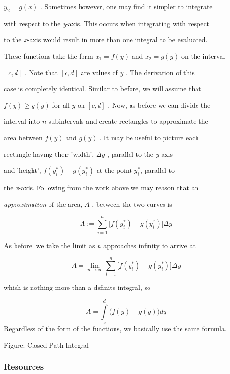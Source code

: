 $y_2=g(x)$ . Sometimes however, one may find it simpler to integrate

with respect to the \textit{y}-axis. This occurs when integrating with respect

to the \textit{x}-axis would result in more than one integral to be evaluated.

These functions take the form $x_1=f(y)$ and $x_2=g(y)$ on the interval

$[c,d]$ . Note that $[c,d]$ are values of $y$ . The derivation of this

case is completely identical. Similar to before, we will assume that

$f(y)\ge g(y)$ for all $y$ on $[c,d]$ . Now, as before we can divide the

interval into $n$ subintervals and create rectangles to approximate the

area between $f(y)$ and $g(y)$ . It may be useful to picture each

rectangle having their 'width', $\Delta y$ , parallel to the \textit{y}-axis

and 'height', $f(y_i^{*})-g(y_i^{*})$ at the point $y_i^{*}$, parallel to

the \textit{x}-axis. Following from the work above we may reason that an

\textit{approximation} of the area, $A$ , between the two curves is


\[
A:=\sum _{i=1}^n \Big[f(y_i^{*})-g(y_i^{*})\Big]\Delta y
\] 

As before, we take the limit as $n$ approaches infinity to arrive at


\[
A=\lim _{n\to\infty}\sum _{i=1}^n \Big[f(y_i^{*})-g(y_i^{*})\Big]\Delta y
\]

which is nothing more than a definite integral, so


\[
A=\int\limits_c^d \bigl(f(y)-g(y)\bigr)dy
\] Regardless of the form of the functions, we basically use the same formula.




Figure: Closed Path Integral


\subsubsection{Resources}
\label{sss:reso-55b5}

